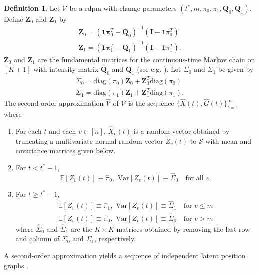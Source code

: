 \documentclass[10pt,journal,compsoc]{IEEEtran}
\theoremstyle{definition}
\newtheorem{definition}{Definition}
\begin{document}
 \begin{definition}
  \label{def:2}
  Let $\mathscr{V}$ be a rdpm with change parameters $(t^{*}, m,
  \pi_0, \pi_1, \mathbf{Q}_0, \mathbf{Q}_1)$. Define
  $\mathbf{Z}_0$ and $\mathbf{Z}_1$ by
  \begin{gather}
    \mathbf{Z}_0 = (\mathbf{1}\mathbf{\pi}_0^{T} -
     \mathbf{Q}_0)^{-1}(\mathbf{I} - \mathbf{1}\pi_0^{T}) \\
    \mathbf{Z}_1 = (\mathbf{1}\mathbf{\pi}_1^{T} -
     \mathbf{Q}_1)^{-1}(\mathbf{I} - \mathbf{1}\pi_1^{T}).
  \end{gather}
  $\mathbf{Z}_0$ and $\mathbf{Z}_1$ are the fundamental matrices
  for the continuous-time Markov chain on $[K+1]$ with intensity
  matrix $\mathbf{Q}_0$ and $\mathbf{Q}_1$ (see
  e.g. \cite[p. 55]{asmussen03:_applied_probab_queues}). Let
  $\Sigma_0$ and $\Sigma_1$ be given by
  \begin{gather*}
    \Sigma_0 = \mathrm{diag}(\pi_0) \mathbf{Z}_0 +
    \mathbf{Z}_0^{T}
    \mathrm{diag}(\pi_0) \\
    \Sigma_1 = \mathrm{diag}(\pi_1) \mathbf{Z}_1 +
    \mathbf{Z}_1^{T}
    \mathrm{diag}(\pi_1).
  \end{gather*}
  The second order approximation $\widehat{\mathscr{V}}$ of
  $\mathscr{V}$ is the sequence $\{\widehat{X}(t),
  \widehat{G}(t)\}_{t=1}^{\infty}$ where
  \begin{enumerate}
  \item For each $t$ and each $v \in [n]$, $\widehat{X}_v(t)$ is a
    random vector obtained by truncating a multivariate normal random
    vector $Z_{v}(t)$ to $\mathscr{S}$ with mean and covariance
    matrices given below.
  \item For $t < t^{*} - 1$,
    \begin{equation}
      \mathbb{E}[Z_v(t)] \equiv \hat{\pi}_0, \,\, 
  \mathrm{Var}[Z_v(t)] \equiv \widehat{\Sigma}_0 \quad \text{for all
    $v$}.
    \end{equation}
  \item For $t \geq t^{*} - 1$,  
    \begin{gather*}
      \mathbb{E}[Z_v(t)] \equiv \hat{\pi}_1, \,\, 
\mathrm{Var}[Z_v(t)] \equiv \widehat{\Sigma}_{1} \quad \text{for $v
  \leq m$} \\
  \mathbb{E}[Z_v(t)] \equiv \hat{\pi}_0, \,\, \mathrm{Var}[Z_v(t)] \equiv \widehat{\Sigma}_{0} \quad \text{for $v
        > m$}
    \end{gather*}
    where $\widehat{\Sigma}_0$ and $\widehat{\Sigma}_1$ are the $K
    \times K$ matrices
    obtained by removing the last row and column of $\Sigma_0$ and
    $\Sigma_1$, respectively. 
  \end{enumerate}
\end{definition}
A second-order approximation yields a sequence of independent latent
position graphs \cite{marchette08:_predic,scheinerman10:_model,hoff02:_laten}. 
\end{document}
